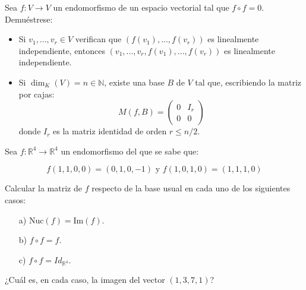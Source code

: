 \begin{ejercicio}
    Sea $f: V \rightarrow V$ un endomorfismo de un espacio vectorial tal que $f \circ f = 0$. Demuéstrese:
    \begin{itemize}
        \item Si $v_1, ..., v_r \in V$ verifican que $(f(v_1), ..., f(v_r))$ es linealmente independiente, entonces $(v_1, ..., v_r, f(v_1), ..., f(v_r))$ es linealmente independiente.
        \item Si $\dim_K(V) = n \in \mathbb{N}$, existe una base $B$ de $V$ tal que, escribiendo la matriz por cajas:
        $$M(f,B) = \begin{pmatrix} 0 & I_r \\ 0 & 0 \end{pmatrix}$$
        donde $I_r$ es la matriz identidad de orden $r \leq n/2$.
    \end{itemize}
\end{ejercicio}

\begin{ejercicio}
    Sea $f: \mathbb{R}^4 \rightarrow \mathbb{R}^4$ un endomorfismo del que se sabe que:

    $$f(1,1,0,0) = (0,1,0,-1) \text{ y } f(1,0,1,0) = (1,1,1,0)$$

    Calcular la matriz de $f$ respecto de la base usual en cada uno de los siguientes casos:

    \begin{enumerate}
        \item[a)] $\text{Nuc}(f) = \text{Im}(f)$.
        \item[b)] $f \circ f = f$.
        \item[c)] $f \circ f = Id_{\mathbb{R}^4}$.
    \end{enumerate}

    ¿Cuál es, en cada caso, la imagen del vector $(1,3,7,1)$?
\end{ejercicio}


